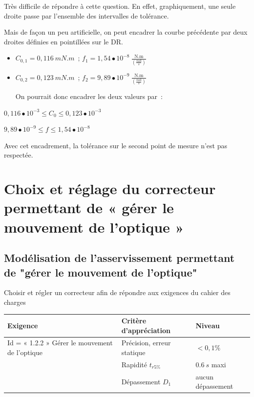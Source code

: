 \ifprof
\begin{corrige}
\end{corrige}
\else
\fi


\ifprof
\begin{corrige}
Très difficile de répondre à cette question. En effet, graphiquement,
  une seule droite passe par l'ensemble des intervalles de tolérance.

  Mais de façon un peu artificielle, on peut encadrer la courbe
  précédente par deux droites définies en pointillées sur le DR.

\begin{itemize}
\item
  \(C_{0,1} = 0,116\ mN.m\)~;
  \(f_{1} = 1,54 \bullet 10^{- 8}\ \frac{\text{N.m}}{\left( \frac{\text{rad}}{s} \right)}\)
\item
  \(C_{0,2} = 0,123\ mN.m\)~;
  \(f_{2} = 9,89 \bullet 10^{- 9}\ \frac{\text{N.m}}{\left( \frac{\text{rad}}{s} \right)}\)

  On pourrait donc encadrer les deux valeurs par~:
\end{itemize}

\(0,116 \bullet 10^{- 3} \leq C_{0} \leq 0,123 \bullet 10^{- 3}\ \)

\(9,89 \bullet 10^{- 9} \leq f \leq 1,54 \bullet 10^{- 8}\)

Avec cet encadrement, la tolérance sur le second point de mesure n'est
pas respectée.
\end{corrige}
\else
\fi


\section{Choix et réglage du correcteur permettant de « gérer le mouvement
de l’optique »}
\subsection{Modélisation de l'asservissement permettant de "gérer le mouvement de l'optique"}

\begin{obj}
Choisir et régler un correcteur afin de répondre aux exigences du cahier des charges
\end{obj}

\begin{center}
\begin{tabular}{|p{}|p{}|p{}|}
\hline 
\textbf{Exigence} & \textbf{Critère d'appréciation} & \textbf{Niveau} \\ 
\hline 
Id = « 1.2.2 » Gérer le mouvement de l'optique & Précision, erreur statique & $<0,1\%$ \\ 
\cline{2-3}
& Rapidité $t_{r5\%}$ & $\SI{0,6}{s}$ maxi \\ 
\cline{2-3}
& Dépassement $D_1$ & aucun dépassement \\ 
\hline 
\end{tabular} 
\end{center}


